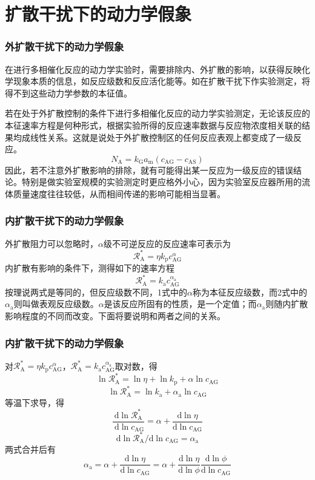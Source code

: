 \section{扩散干扰下的动力学假象}

\begin{frame}
    \frametitle{外扩散干扰下的动力学假象}

    在进行多相催化反应的动力学实验时，需要排除内、外扩散的影响，以获得反映化学现象本质的信息，如反应级数和反应活化能等。如在扩散干扰下作实验测定，将得不到这些动力学参数的本征值。

    若在处于外扩散控制的条件下进行多相催化反应的动力学实验测定，无论该反应的本征速率方程是何种形式，根据实验所得的反应速率数据与反应物浓度相关联的结果均成线性关系。这就是说处于外扩散控制区的任何反应表观上都变成了一级反应。    
    \[
        N_\mathrm{A} = k_\mathrm{G}a_\mathrm{m}(c_\mathrm{AG} - c_\mathrm{AS})
    \]
    因此，若不注意外扩散影响的排除，就有可能得出某一反应为一级反应的错误结论。特别是做实验室规模的实验测定时更应格外小心，因为实验室反应器所用的流体质量速度往往较低，从而相间传递的影响可能相当显著。

\end{frame}


\begin{frame}
    \frametitle{内扩散干扰下的动力学假象}

    外扩散阻力可以忽略时，$\alpha$级不可逆反应的反应速率可表示为
    \[
        \mathscr{R}_{\mathrm{A}}^{*}=\eta k_{\mathrm{p}} c_{\mathrm{AG}}^\alpha
    \]
    内扩散有影响的条件下，测得如下的速率方程
    \[
        \mathscr{R}_{\mathrm{A}}^{*}=k_{\mathrm{a}} c_{\mathrm{AG}}^{\alpha_\mathrm{a}}
    \]
    按理说两式是等同的，但反应级数不同，1式中的$\alpha$称为本征反应级数，而2式中的$\alpha_\mathrm{a}$则叫做表观反应级数。$\alpha$是该反应所固有的性质，是一个定值；而$\alpha_\mathrm{a}$则随内扩散影响程度的不同而改变。下面将要说明和两者之间的关系。

\end{frame}


\begin{frame}
    \frametitle{内扩散干扰下的动力学假象}

    对$\mathscr{R}_{\mathrm{A}}^{*}=\eta k_{\mathrm{p}} c_{\mathrm{AG}}^\alpha$，$\mathscr{R}_{\mathrm{A}}^{*}=k_{\mathrm{a}} c_{\mathrm{AG}}^{\alpha_\mathrm{a}}$取对数，得
    \[
        \ln \mathscr{R}_{\mathrm{A}}^{*}=\ln \eta+\ln k_{\mathrm{p}}+\alpha \ln c_{\mathrm{AG}}
    \]
    \[
        \ln \mathscr{R}_{\mathrm{A}}^{*}= \ln k_{\mathrm{a}}+\alpha_\mathrm{a} \ln c_{\mathrm{AG}}
    \]
    等温下求导，得
    \[
        \frac{\mathrm{d} \ln \mathscr{R}_{\mathrm{A}}^{*}}{\mathrm{~d} \ln c_{\mathrm{AG}}}=\alpha+\frac{\mathrm{d} \ln \eta}{\mathrm{d} \ln c_{\mathrm{AG}}}
    \]
    \[
        \mathrm{d} \ln \mathscr{R}_{\mathrm{A}}^{*} / \mathrm{d} \ln c_{\mathrm{AG}}=\alpha_{\mathrm{a}}
    \]
    两式合并后有
    \[
        \alpha_{\mathrm{a}}=\alpha+\frac{\mathrm{d} \ln \eta}{\mathrm{d} \ln c_{\mathrm{AG}}}=\alpha+\frac{\mathrm{d} \ln \eta}{\mathrm{d} \ln \phi} \frac{\mathrm{d} \ln \phi}{\mathrm{d} \ln c_{\mathrm{AG}}}
    \]

\end{frame}


